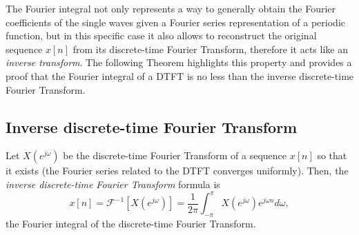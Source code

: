 \documentclass[\documentfontsize, twocolumn]{\classname}
\begin{document}
The Fourier integral not only represents a way to generally obtain the Fourier coefficients of the single waves given a Fourier series representation of a periodic function, but in this specific case it also allows to reconstruct the original sequence $x[n]$ from its discrete-time Fourier Transform, therefore it acts like an \emph{inverse transform}. The following Theorem highlights this property and provides a proof that the Fourier integral of a DTFT is no less than the inverse discrete-time Fourier Transform.

\subsection{Inverse discrete-time Fourier Transform}

\begin{thm}
    Let $X(e^{j\omega})$ be the discrete-time Fourier Transform of a sequence $x[n]$ so that it exists (the Fourier series related to the DTFT converges uniformly). Then, the \emph{inverse discrete-time Fourier Transform} formula is
    \begin{equation}\label{eqn:inverseDiscreteTimeFourierTransform}
        x[n] = \mathcal F^{-1}\left[X(e^{j\omega})\right] = \frac 1 {2\pi} \int_{-\pi}^\pi X(e^{j\omega})e^{j\omega n} d\omega,
    \end{equation}
    the Fourier integral of the discrete-time Fourier Transform.
\end{thm}
\end{document}
